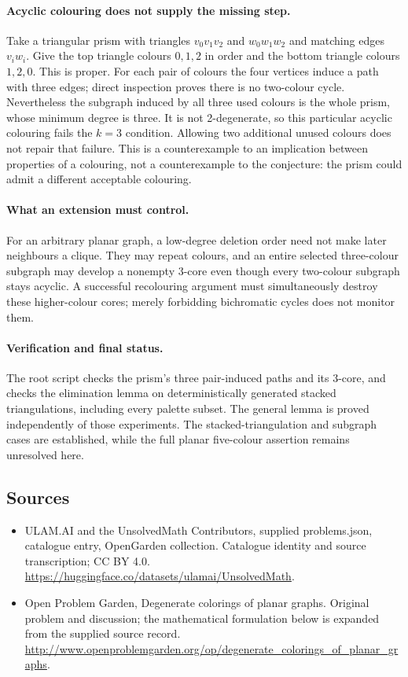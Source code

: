 \documentclass[11pt,a4paper]{article}
\begin{document}
\paragraph{Acyclic colouring does not supply the missing step.}
Take a triangular prism with triangles $v_0v_1v_2$ and $w_0w_1w_2$
and matching edges $v_iw_i$. Give the top triangle colours $0,1,2$
in order and the bottom triangle colours $1,2,0$. This is proper.
For each pair of colours the four vertices induce a path with three
edges; direct inspection proves there is no two-colour cycle.
Nevertheless the subgraph induced by all three used colours is the
whole prism, whose minimum degree is three. It is not 2-degenerate,
so this particular acyclic colouring fails the $k=3$ condition.
Allowing two additional unused colours does not repair that failure.
This is a counterexample to an implication between properties of a
colouring, not a counterexample to the conjecture: the prism could
admit a different acceptable colouring.

\paragraph{What an extension must control.}
For an arbitrary planar graph, a low-degree deletion order need not
make later neighbours a clique. They may repeat colours, and an
entire selected three-colour subgraph may develop a nonempty
3-core even though every two-colour subgraph stays acyclic.
A successful recolouring argument must simultaneously destroy
these higher-colour cores; merely forbidding bichromatic cycles
does not monitor them.

\paragraph{Verification and final status.}
The root script checks the prism's three pair-induced paths and its
3-core, and checks the elimination lemma on deterministically
generated stacked triangulations, including every palette subset.
The general lemma is proved independently of those experiments.
The stacked-triangulation and subgraph cases are established, while
the full planar five-colour assertion remains unresolved here.

\subsection{Sources}
\begin{itemize}
\item[S1] ULAM.AI and the UnsolvedMath Contributors, supplied problems.json, catalogue entry, OpenGarden collection. Catalogue identity and source transcription; CC BY 4.0.
\url{https://huggingface.co/datasets/ulamai/UnsolvedMath}.
\item[S2] Open Problem Garden, Degenerate colorings of planar graphs. Original problem and discussion; the mathematical formulation below is expanded from the supplied source record.
\url{http://www.openproblemgarden.org/op/degenerate_colorings_of_planar_graphs}.

\end{itemize}
\end{document}
